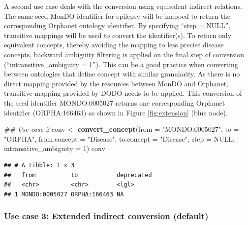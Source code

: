 \documentclass[9pt,a4paper,]{extarticle}
\newenvironment{Shaded}{\begin{snugshade}}{\end{snugshade}}
\newcommand{\CommentTok}[1]{\textcolor[rgb]{0.56,0.35,0.01}{\textit{#1}}}
\newcommand{\DataTypeTok}[1]{\textcolor[rgb]{0.13,0.29,0.53}{#1}}
\newcommand{\DecValTok}[1]{\textcolor[rgb]{0.00,0.00,0.81}{#1}}
\newcommand{\KeywordTok}[1]{\textcolor[rgb]{0.13,0.29,0.53}{\textbf{#1}}}
\newcommand{\NormalTok}[1]{#1}
\newcommand{\OtherTok}[1]{\textcolor[rgb]{0.56,0.35,0.01}{#1}}
\newcommand{\StringTok}[1]{\textcolor[rgb]{0.31,0.60,0.02}{#1}}
\begin{document}
A second use case deals with the conversion using equivalent indirect relations. The same seed MonDO identifier for epilepsy will be mapped to return the corresponding Orphanet ontology identifier. By specifying ``step = NULL'', transitive mappings will be used to convert the identifier(s). To return only equivalent concepts, thereby avoiding the mapping to less precise disease concepts, backward ambiguity filtering is applied on the final step of conversion (``intransitive\_ambiguity = 1''). This can be a good practice when converting between ontologies that define concept with similar granularity. As there is no direct mapping provided by the resources between MonDO and Orphanet, transitive mapping provided by DODO needs to be applied. This conversion of the seed identifier MONDO:0005027 returns one corresponding Orphanet identifier (ORPHA:166463) as shown in Figure \ref{fig:extension} (blue node).

\begin{Shaded}
\begin{Highlighting}[]
\CommentTok{## Use case 2}
\NormalTok{conv <-}\StringTok{ }\KeywordTok{convert_concept}\NormalTok{(}\DataTypeTok{from =} \StringTok{"MONDO:0005027"}\NormalTok{,}
                         \DataTypeTok{to =} \StringTok{"ORPHA"}\NormalTok{,}
                         \DataTypeTok{from.concept =} \StringTok{"Disease"}\NormalTok{,}
                         \DataTypeTok{to.concept =} \StringTok{"Disease"}\NormalTok{,}
                         \DataTypeTok{step =} \OtherTok{NULL}\NormalTok{,}
                         \DataTypeTok{intransitive_ambiguity =} \DecValTok{1}\NormalTok{)}
\NormalTok{conv}
\end{Highlighting}
\end{Shaded}

\begin{verbatim}
## # A tibble: 1 x 3
##   from          to           deprecated
##   <chr>         <chr>        <lgl>     
## 1 MONDO:0005027 ORPHA:166463 NA
\end{verbatim}

\hypertarget{use-case-3-extended-indirect-conversion-default}{%
\subsubsection{Use case 3: Extended indirect conversion (default)}\label{use-case-3-extended-indirect-conversion-default}}
\end{document}
